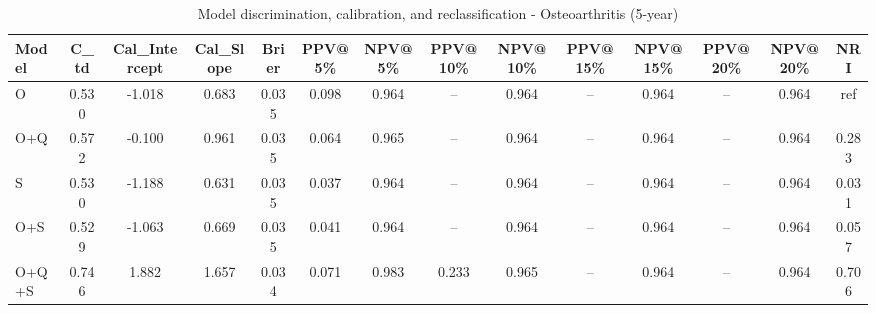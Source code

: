 \begin{table}[htbp]
\centering
\small
\caption{Model discrimination, calibration, and reclassification - Osteoarthritis (5-year)}
\label{tab:perf_osteoarthritis_5y}
\begin{tabular}{lccccccccccccc}
\toprule
Model & C\_td & Cal\_Intercept & Cal\_Slope & Brier & PPV@5\% & NPV@5\% & PPV@10\% & NPV@10\% & PPV@15\% & NPV@15\% & PPV@20\% & NPV@20\% & NRI \\
\midrule
O & 0.530 & -1.018 & 0.683 & 0.035 & 0.098 & 0.964 & -- & 0.964 & -- & 0.964 & -- & 0.964 & ref \\
O+Q & 0.572 & -0.100 & 0.961 & 0.035 & 0.064 & 0.965 & -- & 0.964 & -- & 0.964 & -- & 0.964 & 0.283 \\
S & 0.530 & -1.188 & 0.631 & 0.035 & 0.037 & 0.964 & -- & 0.964 & -- & 0.964 & -- & 0.964 & 0.031 \\
O+S & 0.529 & -1.063 & 0.669 & 0.035 & 0.041 & 0.964 & -- & 0.964 & -- & 0.964 & -- & 0.964 & 0.057 \\
O+Q+S & 0.746 & 1.882 & 1.657 & 0.034 & 0.071 & 0.983 & 0.233 & 0.965 & -- & 0.964 & -- & 0.964 & 0.706 \\
\bottomrule
\end{tabular}
\end{table}